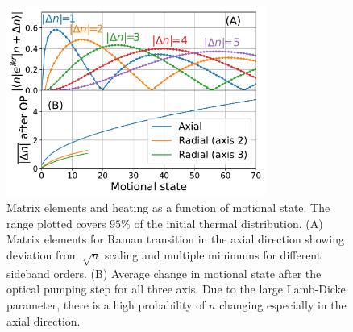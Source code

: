 \documentclass[aps,prl,twocolumn,groupedaddress]{revtex4-1}
\begin{document}
\begin{figure}[b]
  \includegraphics[width=8.5cm]{imgs/fig2_raman_op.pdf}
  \caption{Matrix elements and heating as a function of motional state.
    The range plotted covers $95\%$ of the initial thermal distribution.
    (A) Matrix elements for Raman transition in the axial direction showing deviation from
    $\sqrt{n}$ scaling and multiple minimums for different sideband orders.
    (B) Average change in motional state after the optical pumping step for all three axis.
    Due to the large Lamb-Dicke parameter,
    there is a high probability of $n$ changing especially in the axial direction.
    \label{f-ld}}
\end{figure}
\end{document}
